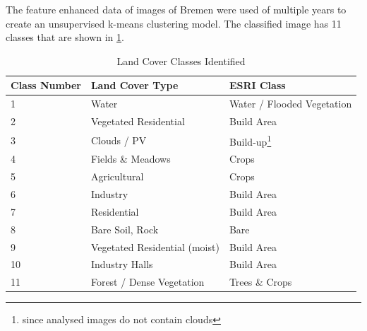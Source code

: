 \documentclass[12pt,a4paper, english,twoside]{scrartcl}
\begin{document}
      The feature enhanced data of images of Bremen%
      were used of multiple years to create an unsupervised k-means clustering model.
      The classified image has 11 classes that are shown in \cref{tab:land_cover_classes}.
      \begin{table}[ht]
      \centering
      \renewcommand{\arraystretch}{1.4}
      \caption{Land Cover Classes Identified\label{tab:land_cover_classes}}
      \begin{tabular}{p{1cm}p{4cm} l }
      \toprule
      \textbf{Class Number} & \textbf{Land Cover Type} & \textbf{ESRI Class}\\
      \midrule
      1 &   Water                         & Water / Flooded Vegetation\\
      2 &   Vegetated Residential         & Build Area\\
      3 &   Clouds / PV                   & Build-up\footnote{since analysed images do not contain clouds} \\
      4 &   Fields \& Meadows             & Crops\\
      5 &   Agricultural                  & Crops\\
      6 &   Industry                      & Build Area\\
      7 &   Residential                   & Build Area\\
      8 &   Bare Soil, Rock               & Bare \\
      9 &   Vegetated Residential (moist) & Build Area\\
      10 &  Industry Halls                & Build Area\\
      11 &  Forest / Dense Vegetation     & Trees \& Crops \\
      \bottomrule
      \end{tabular}
      \end{table}
      \newpage
\end{document}
